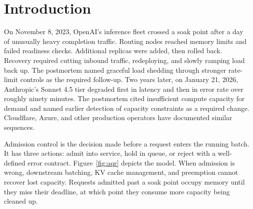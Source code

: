 \documentclass[11pt,letterpaper]{article}
\theoremstyle{definition}
\begin{document}
\section{Introduction}

On November 8, 2023, OpenAI's inference fleet crossed a soak point after
a day of unusually heavy completion traffic. Routing nodes reached
memory limits and failed readiness checks. Additional replicas were
added, then rolled back. Recovery required cutting inbound traffic,
redeploying, and slowly ramping load back up. The postmortem named
graceful load shedding through stronger rate-limit controls as the
required follow-up. Two years later, on January 21, 2026, Anthropic's
Sonnet 4.5 tier degraded first in latency and then in error rate over
roughly ninety minutes. The postmortem cited insufficient compute
capacity for demand and named earlier detection of capacity constraints
as a required change. Cloudflare, Azure, and other production operators
have documented similar sequences.

Admission control is the decision made before a request enters the
running batch. It has three actions: admit into service, hold in queue,
or reject with a well-defined error contract. Figure~\ref{fig:aqr}
depicts the model. When admission is wrong, downstream batching, KV
cache management, and preemption cannot recover lost capacity. Requests
admitted past a soak point occupy memory until they miss their
deadline, at which point they consume more capacity being cleaned up.
\end{document}
